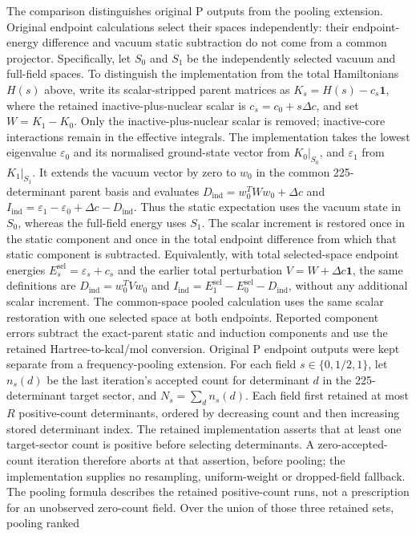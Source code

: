 \documentclass{article}
\begin{document}
The comparison distinguishes original P outputs from the pooling extension. Original endpoint calculations select their spaces independently: their endpoint-energy difference and vacuum static subtraction do not come from a common projector. Specifically, let \(S_0\) and \(S_1\) be the independently selected vacuum and full-field spaces. To distinguish the implementation from the total Hamiltonians \(H(s)\) above, write its scalar-stripped parent matrices as \(K_s=H(s)-c_s\mathbf{1}\), where the retained inactive-plus-nuclear scalar is \(c_s=c_0+s\Delta c\), and set \(W=K_1-K_0\). Only the inactive-plus-nuclear scalar is removed; inactive-core interactions remain in the effective integrals. The implementation takes the lowest eigenvalue \(\varepsilon_0\) and its normalised ground-state vector from \(K_0|_{S_0}\), and \(\varepsilon_1\) from \(K_1|_{S_1}\). It extends the vacuum vector by zero to \(w_0\) in the common 225-determinant parent basis and evaluates \(D_{\mathrm{ind}}=w_0^{T}Ww_0+\Delta c\) and \(I_{\mathrm{ind}}=\varepsilon_1-\varepsilon_0+\Delta c-D_{\mathrm{ind}}\). Thus the static expectation uses the vacuum state in \(S_0\), whereas the full-field energy uses \(S_1\). The scalar increment is restored once in the static component and once in the total endpoint difference from which that static component is subtracted. Equivalently, with total selected-space endpoint energies \(E_s^{\mathrm{sel}}=\varepsilon_s+c_s\) and the earlier total perturbation \(V=W+\Delta c\mathbf{1}\), the same definitions are \(D_{\mathrm{ind}}=w_0^{T}Vw_0\) and \(I_{\mathrm{ind}}=E_1^{\mathrm{sel}}-E_0^{\mathrm{sel}}-D_{\mathrm{ind}}\), without any additional scalar increment. The common-space pooled calculation uses the same scalar restoration with one selected space at both endpoints. Reported component errors subtract the exact-parent static and induction components and use the retained Hartree-to-kcal/mol conversion. Original P endpoint outputs were kept separate from a frequency-pooling extension. For each field \(s\in\{0,1/2,1\}\), let \(n_s(d)\) be the last iteration's accepted count for determinant \(d\) in the 225-determinant target sector, and \(N_s=\sum_d n_s(d)\). Each field first retained at most \(R\) positive-count determinants, ordered by decreasing count and then increasing stored determinant index. The retained implementation asserts that at least one target-sector count is positive before selecting determinants. A zero-accepted-count iteration therefore aborts at that assertion, before pooling; the implementation supplies no resampling, uniform-weight or dropped-field fallback. The pooling formula describes the retained positive-count runs, not a prescription for an unobserved zero-count field. Over the union of those three retained sets, pooling ranked
\end{document}
